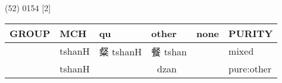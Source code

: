 \documentclass[14pt,a4paper]{scrartcl}
\begin{document}
(52) 0154 {[}2{]}

\begin{longtable}[c]{@{}llllll@{}}
\toprule
\begin{minipage}[b]{0.14\columnwidth}\raggedright\strut
GROUP
\strut\end{minipage} &
\begin{minipage}[b]{0.14\columnwidth}\raggedright\strut
MCH
\strut\end{minipage} &
\begin{minipage}[b]{0.14\columnwidth}\raggedright\strut
qu
\strut\end{minipage} &
\begin{minipage}[b]{0.14\columnwidth}\raggedright\strut
other
\strut\end{minipage} &
\begin{minipage}[b]{0.14\columnwidth}\raggedright\strut
none
\strut\end{minipage} &
\begin{minipage}[b]{0.14\columnwidth}\raggedright\strut
PURITY
\strut\end{minipage}\tabularnewline
\midrule
\endhead
\begin{minipage}[t]{0.14\columnwidth}\raggedright\strut
𣦼
\strut\end{minipage} &
\begin{minipage}[t]{0.14\columnwidth}\raggedright\strut
tshanH
\strut\end{minipage} &
\begin{minipage}[t]{0.14\columnwidth}\raggedright\strut
粲 tshanH
\strut\end{minipage} &
\begin{minipage}[t]{0.14\columnwidth}\raggedright\strut
餐 tshan
\strut\end{minipage} &
\begin{minipage}[t]{0.14\columnwidth}\raggedright\strut
\strut\end{minipage} &
\begin{minipage}[t]{0.14\columnwidth}\raggedright\strut
mixed
\strut\end{minipage}\tabularnewline
\begin{minipage}[t]{0.14\columnwidth}\raggedright\strut
𣦵
\strut\end{minipage} &
\begin{minipage}[t]{0.14\columnwidth}\raggedright\strut
tshanH
\strut\end{minipage} &
\begin{minipage}[t]{0.14\columnwidth}\raggedright\strut
\strut\end{minipage} &
\begin{minipage}[t]{0.14\columnwidth}\raggedright\strut
𣦼 dzan
\strut\end{minipage} &
\begin{minipage}[t]{0.14\columnwidth}\raggedright\strut
\strut\end{minipage} &
\begin{minipage}[t]{0.14\columnwidth}\raggedright\strut
pure:other
\strut\end{minipage}\tabularnewline
\bottomrule
\end{longtable}
\end{document}
